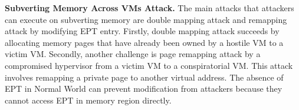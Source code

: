 \documentclass[conference]{IEEEtran}
\begin{document}




\textbf{Subverting Memory Across VMs Attack.}
%
The main attacks that attackers can execute on subverting memory are double mapping attack and remapping attack by modifying EPT entry.
Firstly, double mapping attack succeeds by allocating memory pages that have already been owned by a hostile VM to a victim VM. Secondly, another challenge is page remapping attack by a compromised hypervisor from a victim VM to a conspiratorial VM. This attack involves remapping a private page to another virtual address.
The absence of EPT in Normal World can prevent modification from attackers because they cannot access EPT in memory region directly.

\end{document}
